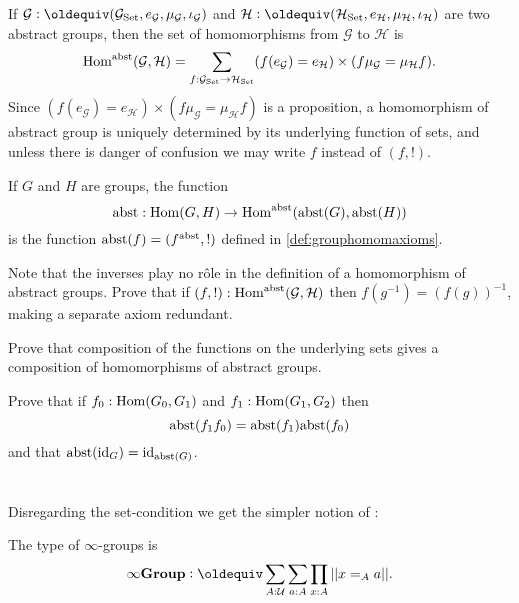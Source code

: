 \begin{definition}\label{def:abstrisfunctor}
  If $\mathcal G\defequi(\mathcal G_{\Set},e_{\mathcal G},\mu_{\mathcal G},\iota_{\mathcal G})$ and $\mathcal H\defequi(\mathcal H_{\Set},e_{\mathcal H},\mu_{\mathcal H},\iota_{\mathcal H})$ are two abstract groups, then the set of homomorphisms from $\mathcal G$ to $\mathcal H$ is
 $$  \Hom^\abstr(\mathcal G,\mathcal H)%
=\sum_{f:\mathcal G_{\Set}\to \mathcal H_{\Set}}(f(e_{\mathcal G})=e_{\mathcal H})\times (f\mu_{\mathcal G}=\mu_{\mathcal H}f).
$$
Since $(f(e_{\mathcal G})=e_{\mathcal H})\times (f\mu_{\mathcal G}=\mu_{\mathcal H}f)$ is a proposition, a homomorphism of abstract group is uniquely determined by its underlying function of sets, and unless there is danger of confusion we may write $f$ instead of $(f,!)$. 

If $G$ and $H$ are groups, the function
$$\mathrm{abst}:\mathrm{Hom}(G,H)\to\mathrm{Hom}^{\mathrm{abst}}(\mathrm{abst}(G),\mathrm{abst}(H))$$
is the function $\mathrm{abst}(f)=(f^{\mathrm{abst}},!)$ defined in \cref{def:grouphomomaxioms}.
\end{definition}
\begin{xca}
  Note that the inverses play no r\^ole in the definition of a homomorphism of abstract groups.  Prove that if $(f,!):\mathrm{Hom}^{\mathrm{abst}}(\mathcal G,\mathcal H)$
then $f(g^{-1})=(f(g))^{-1}$, making a separate axiom redundant.  
\end{xca}
\begin{xca}
Prove that composition of the functions on the underlying sets gives a composition of homomorphisms of abstract groups.

  Prove that if $f_0:\mathrm{Hom}(G_0,G_1)$ and $f_1:\mathrm{Hom}(G_1,G_2)$ then 
$$\mathrm{abst}(f_1f_0)=\mathrm{abst}(f_1)\mathrm{abst}(f_0)$$ and that $\mathrm{abst}(\mathord{\mathrm{id}}_G)=\mathord{\mathrm{id}}_{\mathrm{abst}(G)}$.
\end{xca}



\section{\texorpdfstring{\inftygps}{∞-groups}}
\label{sec:inftygps}

Disregarding the set-condition we get the simpler notion of \inftygps:
\begin{definition}The type of $\infty$-groups is
  $$\typeinftygp\defequi \sum_{A:\UU}\sum_{a:A}\prod_{x:A}||x=_Aa||.$$
\end{definition}

